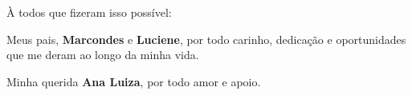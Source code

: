 
\chapter*{}
\vspace{15cm}
\begin{flushright}
	À todos que fizeram isso possível:

	Meus pais, \textbf{Marcondes} e \textbf{Luciene}, por todo carinho, dedicação e oportunidades que me deram ao longo da minha vida.

	Minha querida \textbf{Ana Luiza}, por todo amor e apoio.

\end{flushright}
